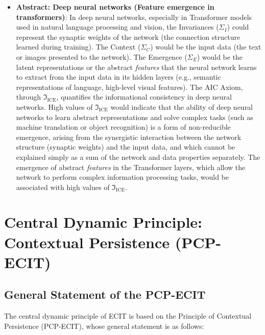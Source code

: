 \documentclass{article}
\begin{document}
\begin{itemize}
\item \textbf{Abstract: Deep neural networks (Feature emergence in transformers)}: In deep neural networks, especially in Transformer models used in natural language processing and vision, the Invariances ($\Sigma_I$) could represent the synaptic weights of the network (the connection structure learned during training). The Context ($\Sigma_C$) would be the input data (the text or images presented to the network). The Emergence ($\Sigma_E$) would be the latent representations or the abstract \textit{features} that the neural network learns to extract from the input data in its hidden layers (e.g., semantic representations of language, high-level visual features). The AIC Axiom, through $\mathfrak{I}_\text{ICE}$, quantifies the informational consistency in deep neural networks. High values of $\mathfrak{I}_\text{ICE}$ would indicate that the ability of deep neural networks to learn abstract representations and solve complex tasks (such as machine translation or object recognition) is a form of non-reducible emergence, arising from the synergistic interaction between the network structure (synaptic weights) and the input data, and which cannot be explained simply as a sum of the network and data properties separately. The emergence of abstract \textit{features} in the Transformer layers, which allow the network to perform complex information processing tasks, would be associated with high values of $\mathfrak{I}_\text{ICE}$.
\end{itemize}



\section{Central Dynamic Principle: Contextual Persistence (PCP-ECIT)}\label{sec:PCP-ECIT}

\subsection{General Statement of the PCP-ECIT}

The central dynamic principle of ECIT is based on the Principle of Contextual Persistence (PCP-ECIT), whose general statement is as follows:
\bigskip

\noindent {}
\end{document}
